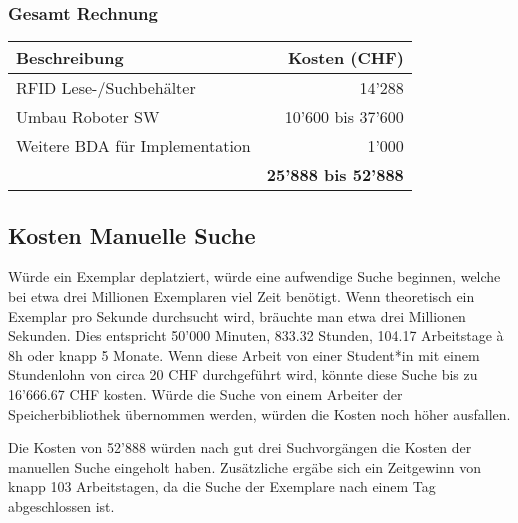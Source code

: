 \subsubsection{Gesamt Rechnung}
\begin{tabularx}{\textwidth}{|X|r|}
	\hline
	\textbf{Beschreibung} & \textbf{Kosten (CHF)} \\
	\hline
	RFID Lese-/Suchbehälter & 14'288 \\
	\hline
	Umbau Roboter SW & 10'600 bis 37'600 \\
	\hline
	Weitere BDA für Implementation & 1'000 \\
	\hline
	& \textbf{25'888 bis 52'888} \\
	\hline
\end{tabularx}

\subsection{Kosten Manuelle Suche}
Würde ein Exemplar deplatziert, würde eine aufwendige Suche beginnen, welche bei etwa drei Millionen Exemplaren viel Zeit benötigt. Wenn theoretisch ein Exemplar pro Sekunde durchsucht wird, bräuchte man etwa drei Millionen Sekunden. Dies entspricht 50'000 Minuten, 833.32 Stunden, 104.17 Arbeitstage à 8h oder knapp 5 Monate. Wenn diese Arbeit von einer Student*in mit einem Stundenlohn von circa 20 CHF durchgeführt wird, könnte diese Suche bis zu 16'666.67 CHF kosten. Würde die Suche von einem Arbeiter der Speicherbibliothek übernommen werden, würden die Kosten noch höher ausfallen.

Die Kosten von 52'888 würden nach gut drei Suchvorgängen die Kosten der manuellen Suche eingeholt haben. Zusätzliche ergäbe sich ein Zeitgewinn von knapp 103 Arbeitstagen, da die Suche der Exemplare nach einem Tag abgeschlossen ist.
